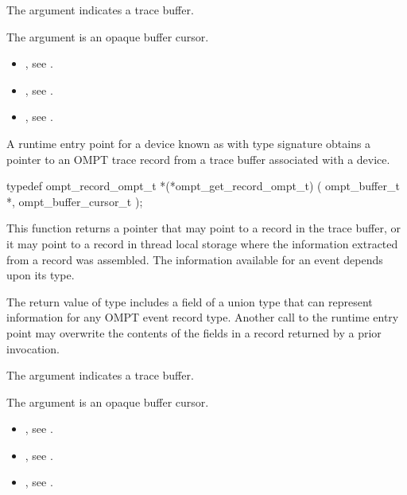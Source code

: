 \argdesc
The argument  indicates a trace buffer.

The argument  is an opaque buffer cursor.




\crossreferences
\begin{itemize}
\item {},
see .
\item {},
see .
\item {},
see .
\end{itemize}

\label{sec:ompt_get_record_ompt_t}

\summary
A runtime entry point for a device known as 
with type signature 
obtains a pointer to an OMPT trace record from a trace buffer associated with a device.

\format
\begin{ccppspecific}
\begin{omptInquiry}
typedef ompt_record_ompt_t *(*ompt_get_record_ompt_t) (
  ompt_buffer_t *,
  ompt_buffer_cursor_t 
);
\end{omptInquiry}
\end{ccppspecific}

\descr

This function returns a pointer that may point to a record in the
trace buffer, or it may point to a record in thread local storage
where the information extracted from a record was assembled. The
information available for an event depends upon its type.

The return value of type 
includes a field of a union type that can represent
information for any OMPT event record type.
Another call to the runtime entry point may overwrite the
contents of the fields in a record returned by a prior invocation.

\argdesc
The argument  indicates a trace buffer.

The argument  is an opaque buffer cursor.

\crossreferences
\begin{itemize}
\item {},
see .
\item {},
see .
\item {},
see .
\end{itemize}

